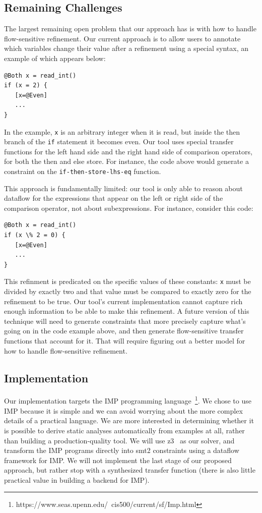\documentclass[10pt,conference]{IEEEtran}
\begin{document}
\subsection{Remaining Challenges}

The largest remaining open problem that our approach has is with how to
handle flow-sensitive refinement. Our current approach is to allow
users to annotate which variables change their value after a refinement
using a special syntax, an example of which appears below:

\begin{lstlisting}
@Both x = read_int()
if (x = 2) {
   [x=@Even]
   ...
}
\end{lstlisting}

In the example, \lstinline{x} is an arbitrary integer when it is read, but
inside the then branch of the \lstinline{if} statement it becomes even.
Our tool uses special transfer functions for the left hand side and the
right hand side of comparison operators, for both the then and else store.
For instance, the code above would generate a constraint on the
\lstinline{if-then-store-lhs-eq} function.

This approach is fundamentally limited: our tool is only able to reason
about dataflow for the expressions that appear on the left or right side
of the comparison operator, not about subexpressions. For instance,
consider this code:

\begin{lstlisting}
@Both x = read_int()
if (x \% 2 = 0) {
   [x=@Even]
   ...
}
\end{lstlisting}

This refinment is predicated on the specific values of these constants:
\lstinline{x} must be divided by exactly two and that value must be
compared to exactly zero for the refinement to be true. Our tool's
current implementation cannot capture rich enough information to be
able to make this refinement. A future version of this technique will need
to generate constraints that more precisely capture what's going on in the
code example above, and then generate flow-sensitive transfer
functions that account for it. That will require figuring out a better
model for how to handle flow-sensitive refinement.

\subsection{Implementation}

Our implementation targets the IMP programming language~\footnote{https://www.seas.upenn.edu/~cis500/current/sf/Imp.html}.
We chose to use IMP because it is simple and we can avoid worrying
about the more complex details of a practical language. We are more interested
in determining whether it is possible to derive static analyses automatically
from examples at all, rather than building a production-quality tool.
We will use z3~\cite{z3} as our solver, and transform the IMP programs directly
into smt2 constraints using a dataflow framework for IMP.
We will not
implement the last stage of our proposed approach, but rather stop with a
synthesized transfer function (there is also little practical value in building
a backend for IMP).
\end{document}

